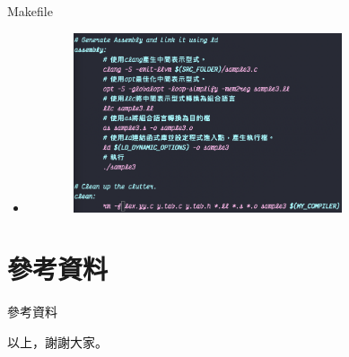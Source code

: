\documentclass{beamer}
\begin{document}
\begin{frame}{Makefile}
\begin{itemize}
    \item \includegraphics[width=300pt,height=150pt]{makefile2.png}
\end{itemize}
\end{frame}

\section{參考資料}
\begin{frame}{參考資料}
    
  
\end{frame}

\begin{frame}{以上，謝謝大家。}
    
\end{frame}
\end{document}
